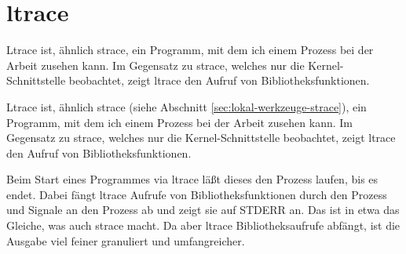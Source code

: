 \section{ltrace}
\label{sec:lokal-werkzeuge-ltrace}
\begin{abstractsec}
  Ltrace ist, ähnlich strace, ein Programm, mit dem ich einem Prozess bei der
  Arbeit zusehen kann. Im Gegensatz zu strace, welches nur die
  Kernel-Schnittstelle beobachtet, zeigt ltrace den Aufruf von
  Bibliotheksfunktionen.
\end{abstractsec}
\begin{normaltext}
  Ltrace ist, ähnlich strace
  (siehe Abschnitt \ref{sec:lokal-werkzeuge-strace}),
  ein Programm, mit dem ich einem Prozess bei der
  Arbeit zusehen kann. Im Gegensatz zu strace, welches nur die
  Kernel-Schnittstelle beobachtet, zeigt ltrace den Aufruf von
  Bibliotheksfunktionen.

  Beim Start eines Programmes via ltrace läßt dieses den Prozess laufen, bis
  es endet. Dabei fängt ltrace Aufrufe von Bibliotheksfunktionen durch den
  Prozess und Signale an den Prozess ab und zeigt sie auf STDERR an. Das ist
  in etwa das Gleiche, was auch strace macht. Da aber ltrace
  Bibliotheksaufrufe abfängt, ist die Ausgabe viel feiner granuliert und
  umfangreicher.


\end{normaltext}
